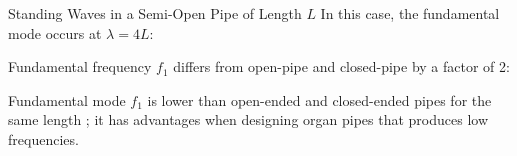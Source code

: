 \documentclass[12pt,compress,aspectratio=169]{beamer}
\begin{document}
\begin{frame}{Standing Waves in a Semi-Open Pipe of Length $L$}
  In this case, the fundamental mode occurs at $\lambda=4L$:
  \begin{center}
  \end{center}
  
  Fundamental frequency $f_1$ differs from open-pipe and closed-pipe by a
  factor of 2:

    
  Fundamental mode $f_1$ is lower than open-ended and closed-ended pipes for
  the same length ; it has advantages when designing organ pipes that produces
  low frequencies.
\end{frame}
\end{document}
